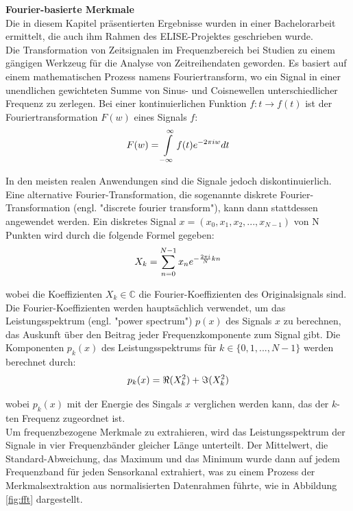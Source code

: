 \textbf{Fourier-basierte Merkmale \\}
Die in diesem Kapitel pr{\"a}sentierten Ergebnisse wurden in einer Bachelorarbeit \cite{bsclittau} ermittelt, die auch ihm Rahmen des ELISE-Projektes geschrieben wurde. \\

Die Transformation von Zeitsignalen im Frequenzbereich bei Studien zu einem g{\"a}ngigen Werkzeug f{\"u}r die Analyse von Zeitreihendaten geworden. Es basiert auf einem mathematischen Prozess namens Fouriertransform, wo ein Signal in einer unendlichen gewichteten Summe von Sinus- und Coisnewellen unterschiedlicher Frequenz zu zerlegen.
Bei einer kontinuierlichen Funktion $ f : t \rightarrow f(t) $ ist der Fouriertransformation $ F(w) $ eines Signals $ f $: 
\begin{equation} 
\Large{ F(w) = \int\limits_{-\infty}^{\infty}{f(t)e^{-2\pi{}iw}dt}} 
\label{equ:fourier} \end{equation}
\vspace{0.2cm}

In den meisten realen Anwendungen sind die Signale jedoch diskontinuierlich. 
Eine alternative Fourier-Transformation, die sogenannte diskrete Fourier-Transformation (engl. "discrete fourier transform"), kann dann stattdessen angewendet werden.
Ein diskretes Signal $ x = (x_{0},x_{1},x_{2},...,x_{N-1}) $ von N Punkten wird durch die folgende Formel gegeben:
\begin{equation} 
\Large{ X_{k} = \sum\limits_{n=0}^{N-1} x_{n} e^{- \frac{2 \pi i}{N} kn} } 
\end{equation} 
\vspace{0.2cm}

wobei die Koeffizienten $ X_{k} \in \mathbb{C} $ die Fourier-Koeffizienten des Originalsignals sind.
Die Fourier-Koeffizienten werden haupts{\"a}chlich verwendet, um das Leistungsspektrum (engl. "power spectrum") $ p(x) $ des Signals $x$ zu berechnen, das Auskunft {\"u}ber den Beitrag jeder Frequenzkomponente zum Signal gibt. 
Die Komponenten $ p_{k}(x) $ des Leistungsspektrums f{\"u}r $ k \in \lbrace 0,1,...,N-1 \rbrace$ werden berechnet durch: 
\begin{equation} 
\Large{ p_{k}(x) = \Re(X_{k}^{2})+\Im(X_{k}^{2}) } 
\end{equation} 

wobei $ p_{k}(x) $ mit der Energie des Singals $x$ verglichen werden kann, das der $k$-ten Frequenz zugeordnet ist. \\


Um frequenzbezogene Merkmale zu extrahieren, wird das Leistungsspektrum der Signale in vier Frequenzb{\"a}nder gleicher L{\"a}nge unterteilt.
Der Mittelwert, die Standard-Abweichung, das Maximum und das Minimum wurde dann auf jedem Frequenzband f{\"u}r jeden Sensorkanal extrahiert, was zu einem Prozess der Merkmalsextraktion aus normalisierten Datenrahmen f{\"u}hrte, wie in Abbildung \ref{fig:fft} dargestellt. 

